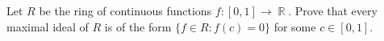 \documentclass{article}
\DeclareMathOperator{\R}{\mathbb{R}}
\begin{document}
Let \(R\) be the ring of continuous functions \(f:[0,1]\to\R\). Prove that every maximal ideal of \(R\) is of the form \(\{f\in R:f(c)=0\}\) for some \(c\in[0,1]\).
\end{document}
